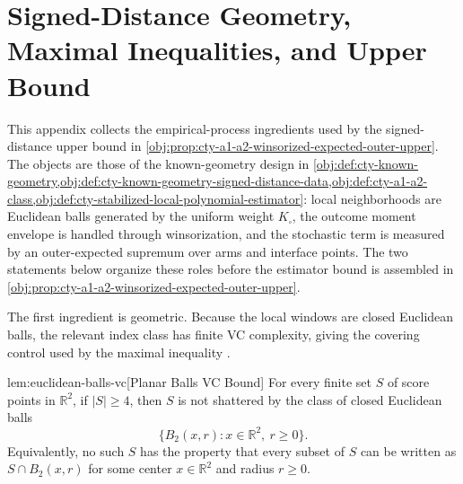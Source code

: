 \documentclass[11pt]{article}
\begin{document}
\section{Signed-Distance Geometry, Maximal Inequalities, and Upper Bound}
\label{sec:app-signed-upper}

This appendix collects the empirical-process ingredients used by the signed-distance upper bound in \cref{obj:prop:cty-a1-a2-winsorized-expected-outer-upper}. The objects are those of the known-geometry design in \cref{obj:def:cty-known-geometry,obj:def:cty-known-geometry-signed-distance-data,obj:def:cty-a1-a2-class,obj:def:cty-stabilized-local-polynomial-estimator}: local neighborhoods are Euclidean balls generated by the uniform weight \(K_\square\), the outcome moment envelope is handled through winsorization, and the stochastic term is measured by an outer-expected supremum over arms and interface points. The two statements below organize these roles before the estimator bound is assembled in \cref{obj:prop:cty-a1-a2-winsorized-expected-outer-upper}.

The first ingredient is geometric. Because the local windows are closed Euclidean balls, the relevant index class has finite VC complexity, giving the covering control used by the maximal inequality \citep{Vapnik1971,Pollard1984,VanderVaart1996}.

\begin{lemmav}{lem:euclidean-balls-vc}[Planar Balls VC Bound]
For every finite set \(S\) of score points in \(\mathbb R^2\), if \(|S|\ge 4\), then \(S\) is not shattered by the class of closed Euclidean balls
\[
\{B_2(x,r): x\in\mathbb R^2,\ r\ge 0\}.
\]
Equivalently, no such \(S\) has the property that every subset of \(S\) can be written as \(S\cap B_2(x,r)\) for some center \(x\in\mathbb R^2\) and radius \(r\ge 0\).
\end{lemmav}
\end{document}
